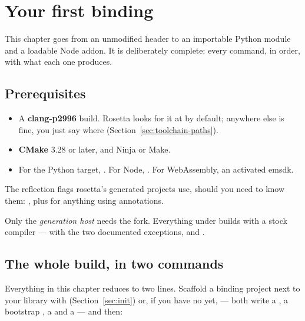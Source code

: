 \chapter{Your first binding}
\label{ch:first}

This chapter goes from an unmodified header to an importable Python module and
a loadable Node addon. It is deliberately complete: every command, in order,
with what each one produces.

\section{Prerequisites}

\begin{itemize}
  \item A \textbf{clang-p2996} build. Rosetta looks for it at
     by default; anywhere else
    is fine, you just say where (Section~\ref{sec:toolchain-paths}).
  \item \textbf{CMake} 3.28 or later, and Ninja or Make.
  \item For the Python target, . For Node,
    . For WebAssembly, an activated emsdk.
\end{itemize}

The reflection flags rosetta's generated projects use, should you need to know
them: , plus
 for anything using annotations.

\begin{note}
Only the \emph{generation host} needs the fork. Everything under
 builds with a stock compiler --- with the two documented
exceptions,  and .
\end{note}

\section{The whole build, in two commands}
\label{sec:twocommands}

Everything in this chapter reduces to two lines. Scaffold a binding project
next to your library with  (Section~\ref{sec:init})
or, if you have no  yet,  ---
both write a , a bootstrap , a
 and a  --- and then:

